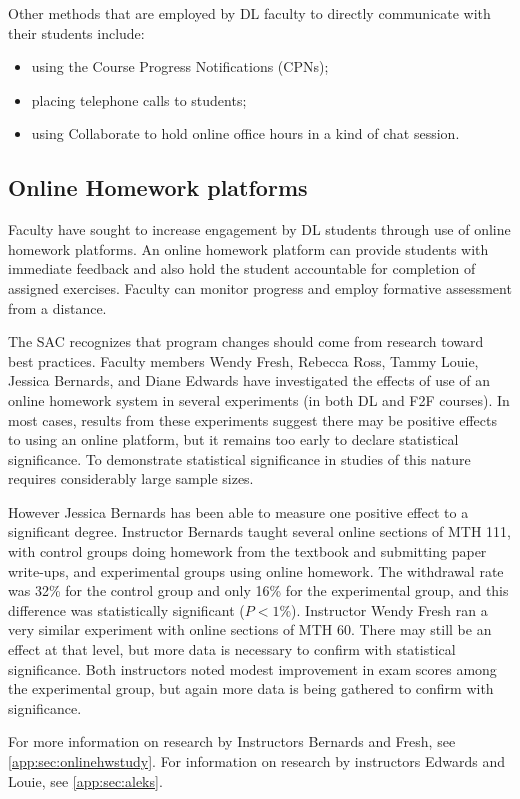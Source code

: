 Other methods that are employed by DL faculty to directly communicate with their students include:
\begin{itemize}
\item using the Course Progress Notifications (CPNs);
\item placing telephone calls to students;
\item using Collaborate to hold online office hours in a kind of chat session.
\end{itemize}

\subsection{Online Homework platforms}
Faculty have sought to increase engagement by DL students through use of online homework platforms. An online homework platform can provide students with immediate feedback and also hold the student accountable for completion of assigned exercises. Faculty can monitor progress and employ formative assessment from a distance.

The SAC recognizes that program changes should come from research toward best practices.  Faculty members Wendy Fresh, Rebecca Ross, Tammy Louie, Jessica Bernards, and Diane Edwards have investigated the effects of use of an online homework system in several experiments (in both DL and F2F courses). In most cases, results from these experiments suggest there may be positive effects to using an online platform, but it remains too early to declare statistical significance. To demonstrate statistical significance in studies of this nature requires considerably large sample sizes. 

However Jessica Bernards has been able to measure one positive effect to a significant degree. Instructor Bernards taught several online sections of MTH 111, with control groups doing homework from the textbook and submitting paper write-ups, and experimental groups using online homework. The withdrawal rate was 32\% for the control group and only 16\% for the experimental group, and this difference was statistically significant ($P<1\%$).  Instructor Wendy Fresh ran a very similar experiment with online sections of MTH 60. There may still be an effect at that level, but more data is necessary to confirm with statistical significance. Both instructors noted modest improvement in exam scores among the experimental group, but again more data is being gathered to confirm with significance.

For more information on research by Instructors Bernards and Fresh, see \cref{app:sec:onlinehwstudy}. For information on research by instructors Edwards and Louie, see \cref{app:sec:aleks}. 

